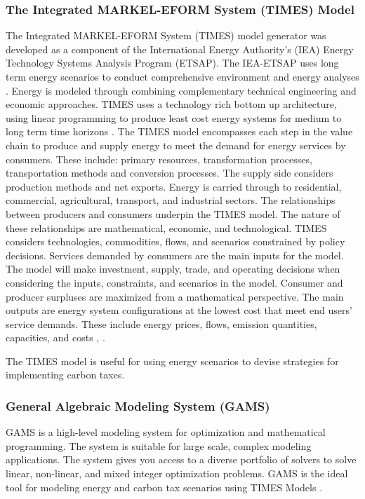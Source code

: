 \documentclass[12pt]{article}
\begin{document}
\subsubsection{The Integrated MARKEL-EFORM System (TIMES) Model}
The Integrated MARKEL-EFORM System (TIMES) model generator was developed as a component of the International Energy Authority's (IEA) Energy Technology Systems Analysis Program (ETSAP). 
The IEA-ETSAP uses long term energy scenarios to conduct comprehensive environment and energy analyses \cite{J:7}.
Energy is modeled through combining complementary technical engineering and economic approaches. 
TIMES uses a technology rich bottom up architecture, using linear programming to produce least cost energy systems for medium to long term time horizons \cite{J:8}.
The TIMES model encompasses each step in the value chain to produce and supply energy to meet the demand for energy services by consumers.
These include: primary resources, transformation processes, transportation methods and conversion processes. 
The supply side considers production methods and net exports. 
Energy is carried through to residential, commercial, agricultural, transport, and industrial sectors. 
The relationships between producers and consumers underpin the TIMES model. 
The nature of these relationships are mathematical, economic, and technological. 
TIMES considers technologies, commodities, flows, and scenarios constrained by policy decisions.
Services demanded by consumers are the main inputs for the model.
The model will make investment, supply, trade, and operating decisions when considering the inputs, constraints, and scenarios in the model. 
Consumer and producer surpluses are maximized from a mathematical perspective.
The main outputs are energy system configurations at the lowest cost that meet end users' service demands. 
These include energy prices, flows, emission quantities, capacities, and costs \cite{J:8}, \cite{W:12}.

The TIMES model is useful for using energy scenarios to devise strategies for implementing carbon taxes.

\subsubsection{General Algebraic Modeling System (GAMS)}
GAMS is a high-level modeling system for optimization and mathematical programming.
The system is suitable for large scale, complex modeling applications. 
The system gives you access to a diverse portfolio of solvers to solve linear, non-linear, and mixed integer optimization problems.
GAMS is the ideal tool for modeling energy and carbon tax scenarios using TIMES Models \cite{W:11}.
\end{document}
